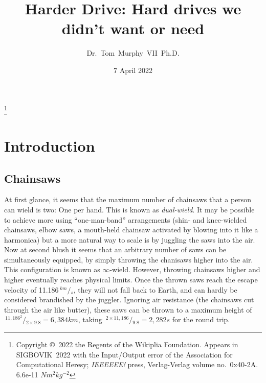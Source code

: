 \documentclass[twocolumn]{article}
\newcommand\sfrac[2]{\!{}\,^{#1}\!/{}\!_{#2}}
\begin{document}
\title{Harder Drive: Hard drives we didn't want or need}
\author{Dr.~Tom~Murphy~VII~Ph.D.}\thanks{
Copyright \copyright\ 2022 the Regents of the Wikiplia Foundation.
Appears in SIGBOVIK~2022 with the
Input/Output error of the Association for Computational Heresy; {\em IEEEEEE!}
press, Verlag-Verlag volume no.~0x40-2A. 6.6e-11 $N m^2kg^{-2}$
}

\renewcommand\th{\ensuremath{{}^{\textrm{th}}}}
\newcommand\st{\ensuremath{{}^{\textrm{st}}}}
\newcommand\rd{\ensuremath{{}^{\textrm{rd}}}}
\newcommand\nd{\ensuremath{{}^{\textrm{nd}}}}

\renewcommand\paragraph[1]{\smallskip \noindent{\bf #1}\enspace}

\date{7 April 2022}

\maketitle \thispagestyle{empty}

\sloppypar


\section{Introduction}

\subsection{Chainsaws}

At first glance, it seems that the maximum number of chainsaws that a
person can wield is two: One per hand. This is known as {\em
  dual-wield}. It may be possible to achieve more using
``one-man-band'' arrangements (shin- and knee-wielded chainsaws, elbow
saws, a mouth-held chainsaw activated by blowing into it like a
harmonica) but a more natural way to scale is by juggling the saws
into the air. Now at second blush it seems that an arbitrary number of
saws can be simultaneously equipped, by simply throwing the chanisaws
higher into the air. This configuration is known as $\infty$-wield.
However, throwing chainsaws higher and higher eventually reaches
physical limits. Once the thrown saws reach the escape velocity of
11.186$\sfrac{km}{s}$, they will not fall back to Earth, and can
hardly be considered brandished by the juggler. Ignoring air resistance
(the chainsaws cut through the air like butter), these saws can be
thrown to a maximum height of $\sfrac{11,186^{2}}{2 \times 9.8} = 6,384 km$,
taking $\sfrac{2 \times 11,186}{9.8} = 2,282 s$ for the round trip.
\end{document}
